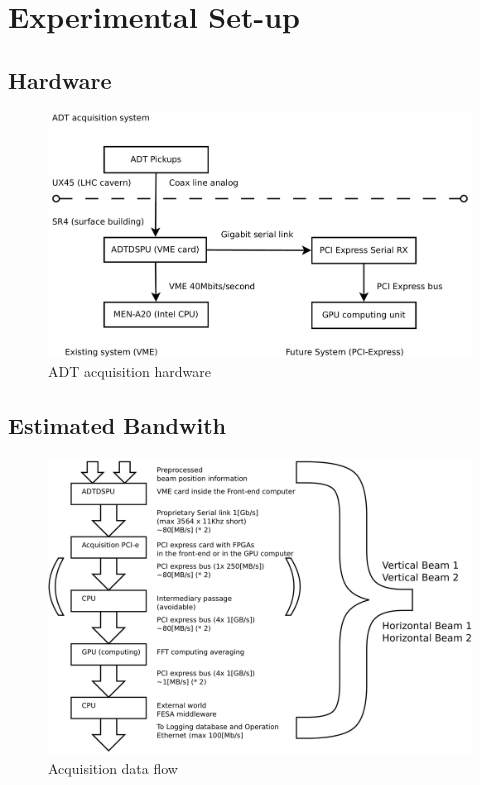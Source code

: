 \section{Experimental Set-up}

   \subsection{Hardware}

\begin{figure}
\caption{ADT acquisition hardware}
\centering
\includegraphics[scale=0.3]{acquisition.pdf}
\end{figure}

   \subsection{Estimated Bandwith}

\begin{figure}
\caption{Acquisition data flow}
\centering
\includegraphics[scale=0.3]{dataflow.pdf}
\end{figure}

